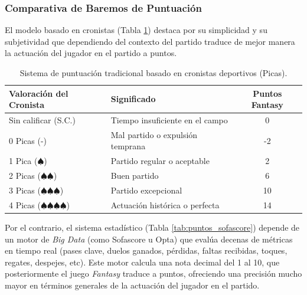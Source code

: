 \subsubsection{Comparativa de Baremos de Puntuación}

El modelo basado en cronistas (Tabla \ref{tab:puntos_picas}) destaca por su simplicidad y su subjetividad que dependiendo del contexto del partido traduce de mejor manera la actuación del jugador en el partido a puntos.

\begin{table}[H]
    \centering
    \begin{tabular}{|l|l|c|}
        \hline
        \textbf{Valoración del Cronista} & \textbf{Significado} & \textbf{Puntos Fantasy} \\
        \hline
        Sin calificar (S.C.) & Tiempo insuficiente en el campo & 0 \\
        \hline
        0 Picas (-) & Mal partido o expulsión temprana & -2 \\
        \hline
        1 Pica ($\spadesuit$) & Partido regular o aceptable & 2 \\
        \hline
        2 Picas ($\spadesuit\spadesuit$) & Buen partido & 6 \\
        \hline
        3 Picas ($\spadesuit\spadesuit\spadesuit$) & Partido excepcional & 10 \\
        \hline
        4 Picas ($\spadesuit\spadesuit\spadesuit\spadesuit$) & Actuación histórica o perfecta & 14 \\
        \hline
    \end{tabular}
    \caption{Sistema de puntuación tradicional basado en cronistas deportivos (Picas).}
    \label{tab:puntos_picas}
\end{table}

Por el contrario, el sistema estadístico (Tabla \ref{tab:puntos_sofascore}) depende de un motor de \textit{Big Data} (como Sofascore u Opta) que evalúa decenas de métricas en tiempo real (pases clave, duelos ganados, pérdidas, faltas recibidas, toques, regates, despejes, etc). Este motor calcula una nota decimal del 1 al 10, que posteriormente el juego \textit{Fantasy} traduce a puntos, ofreciendo una precisión mucho mayor en términos generales de la actuación del jugador en el partido.

